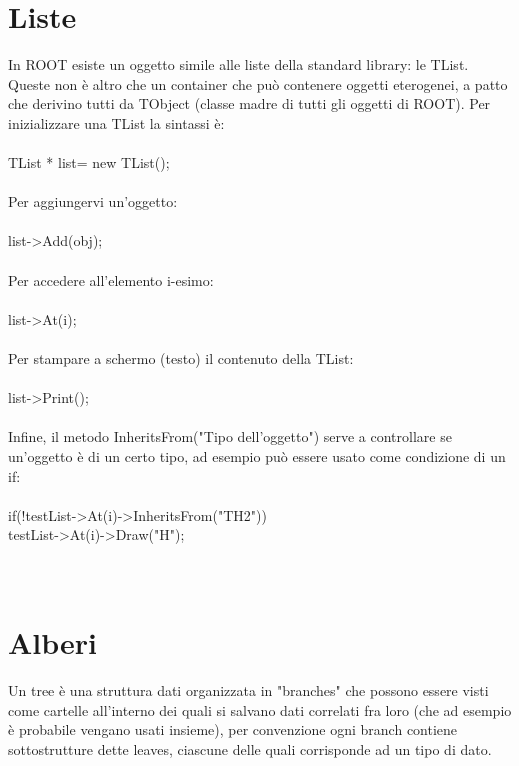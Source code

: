 \documentclass[10pt,a4paper]{article}
\begin{document}
\section{Liste}
In ROOT esiste un oggetto simile alle liste della standard library: le TList. Queste non è altro che un container che può contenere oggetti eterogenei, a patto che derivino tutti da TObject (classe madre di tutti gli oggetti di ROOT). Per inizializzare una TList la sintassi è:\\\\
TList * list= new TList();\\\\
Per aggiungervi un'oggetto:\\\\
list->Add(obj);\\\\
Per accedere all'elemento i-esimo:\\\\
list->At(i);\\\\
Per stampare a schermo (testo) il contenuto della TList:\\\\
list->Print();\\\\
Infine, il metodo InheritsFrom("Tipo dell'oggetto") serve a controllare se un'oggetto è di un certo tipo, ad esempio può essere usato come condizione di un if:\\\\
if(!testList->At(i)->InheritsFrom("TH2")){\\
	testList->At(i)->Draw("H");\\
}\\\\
\section{Alberi}
Un tree è una struttura dati organizzata in "branches" che possono essere visti come cartelle all'interno dei quali si salvano dati correlati fra loro (che ad esempio è probabile vengano usati insieme), per convenzione ogni branch contiene sottostrutture dette leaves, ciascune delle quali corrisponde ad un tipo di dato.
\end{document}
